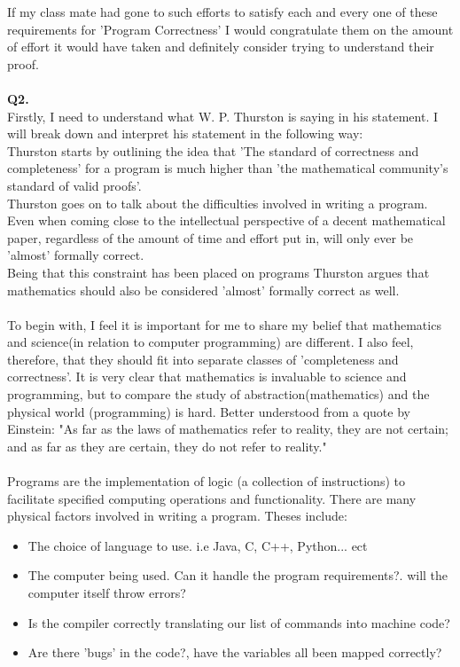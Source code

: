\documentclass[a4paper,12pt]{article}
\begin{document}
If my class mate had gone to such efforts to satisfy each and every one of these requirements for 'Program Correctness' I would congratulate them on the amount of effort it would have taken and definitely consider trying to understand their proof.\\
\\
\noindent \textbf{Q2.} \\
Firstly, I need to understand what W. P. Thurston is saying in his statement. I will break down and interpret his statement in the following way: \\
Thurston starts by outlining the idea that 'The standard of correctness and completeness' for a program is much higher than 'the mathematical community's standard of valid proofs'.\\
Thurston goes on to talk about the difficulties involved in writing a program. Even when coming close to the intellectual perspective of a decent mathematical paper, regardless of the amount of time and effort put in, will only ever be 'almost' formally correct. \\
Being that this constraint has been placed on programs Thurston argues that mathematics should also be considered 'almost' formally correct as well. \\
\\
To begin with, I feel it is important for me to share my belief that mathematics and science(in relation to computer programming) are different. I also feel, therefore, that they should fit into separate classes of 'completeness and correctness'. It is very clear that mathematics is invaluable to science and programming, but to compare the study of abstraction(mathematics) and the physical world (programming) is hard. Better understood from a quote by Einstein: "As far as the laws of mathematics refer to reality, they are not certain; and as far as they are certain, they do not refer to reality."\\
\\
Programs are the implementation of logic (a collection of instructions) to facilitate specified computing operations and functionality. There are many physical factors involved in writing a program. Theses include:
\begin{itemize}
\item The choice of language to use. i.e Java, C, C++, Python... ect
\item The computer being used. Can it handle the program requirements?. will the computer itself throw errors?
\item Is the compiler correctly translating our list of commands into machine code? 
\item Are there 'bugs' in the code?, have the variables all been mapped correctly?
\end{itemize} 
\end{document}
